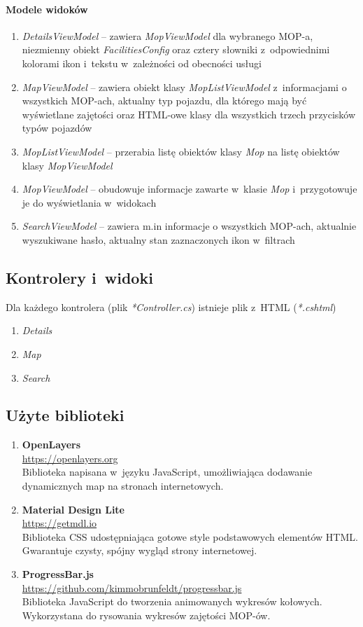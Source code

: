 \paragraph{Modele widoków}
\begin{enumerate}
\item \textit{DetailsViewModel} -- zawiera \textit{MopViewModel} dla wybranego MOP-a, niezmienny obiekt \textit{FacilitiesConfig} oraz cztery słowniki z~odpowiednimi kolorami ikon i~tekstu w~zależności od obecności usługi
\item \textit{MapViewModel} -- zawiera obiekt klasy \textit{MopListViewModel} z~informacjami o wszystkich MOP-ach, aktualny typ pojazdu, dla którego mają być wyświetlane zajętości oraz HTML-owe klasy dla wszystkich trzech przycisków typów pojazdów
\item \textit{MopListViewModel} -- przerabia listę obiektów klasy \textit{Mop} na listę obiektów klasy \textit{MopViewModel}
\item \textit{MopViewModel} -- obudowuje informacje zawarte w~klasie \textit{Mop} i~przygotowuje je do wyświetlania w~widokach
\item \textit{SearchViewModel} -- zawiera m.in informacje o wszystkich MOP-ach, aktualnie wyszukiwane hasło, aktualny stan zaznaczonych ikon w~filtrach
\end{enumerate}

\subsection{Kontrolery i~widoki}
Dla każdego kontrolera (plik \textit{*Controller.cs}) istnieje plik z~HTML (\textit{*.cshtml})
\begin{enumerate}
\item \textit{Details}
\item \textit{Map}
\item \textit{Search}
\end{enumerate}

\subsection{Użyte biblioteki}
\begin{enumerate}
\item \textbf{OpenLayers} \\
\url{https://openlayers.org}\\
Biblioteka napisana w~języku JavaScript, umożliwiająca dodawanie dynamicznych map na stronach internetowych.

\item \textbf{Material Design Lite} \\
\url{https://getmdl.io}\\
Biblioteka CSS udostępniająca gotowe style podstawowych elementów HTML. Gwarantuje czysty, spójny wygląd strony internetowej.

\item \textbf{ProgressBar.js} \\
\url{https://github.com/kimmobrunfeldt/progressbar.js}\\
Biblioteka JavaScript do tworzenia animowanych wykresów kołowych. Wykorzystana do rysowania wykresów zajętości MOP-ów.
\end{enumerate}


